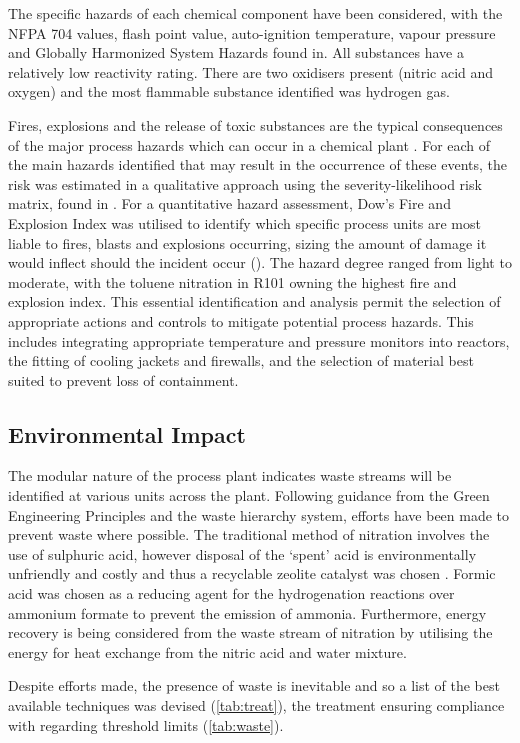 The specific hazards of each chemical component have been considered, with the NFPA 704 values, flash point value, auto-ignition temperature, vapour pressure and Globally Harmonized System Hazards found in. All substances have a relatively low reactivity rating. There are two oxidisers present (nitric acid and oxygen) and the most flammable substance identified was hydrogen gas.  

Fires, explosions and the release of toxic substances are the typical consequences of the major process hazards which can occur in a chemical plant \cite{mannan_lees_2012}. For each of the main hazards identified that may result in the occurrence of these events, the risk was estimated in a qualitative approach using the severity-likelihood risk matrix, found in . For a quantitative hazard assessment, Dow's Fire and Explosion Index was utilised to identify which specific process units are most liable to fires, blasts and explosions occurring, sizing the amount of damage it would inflect should the incident occur (). The hazard degree ranged from light to moderate, with the toluene nitration in R101 owning the highest fire and explosion index. This essential identification and analysis permit the selection of appropriate actions and controls to mitigate potential process hazards. This includes integrating appropriate temperature and pressure monitors into reactors, the fitting of cooling jackets and firewalls, and the selection of material best suited to prevent loss of containment.


\subsection{Environmental Impact}

The modular nature of the process plant indicates waste streams will be identified at various units across the plant. Following guidance from the Green Engineering Principles and the waste hierarchy system, efforts have been made to prevent waste where possible. The traditional method of nitration involves the use of sulphuric acid, however disposal of the ‘spent’ acid is environmentally unfriendly and costly and thus a recyclable zeolite catalyst was chosen \cite{smith_superior_1996}.  Formic acid was chosen as a reducing agent for the hydrogenation reactions over ammonium formate to prevent the emission of ammonia. Furthermore, energy recovery is being considered from the waste stream of nitration by utilising the energy for heat exchange from the nitric acid and water mixture. 

Despite efforts made, the presence of waste is inevitable and so a list of the best available techniques was devised (\cref{tab:treat}), the treatment ensuring compliance with regarding threshold limits (\cref{tab:waste}). 
